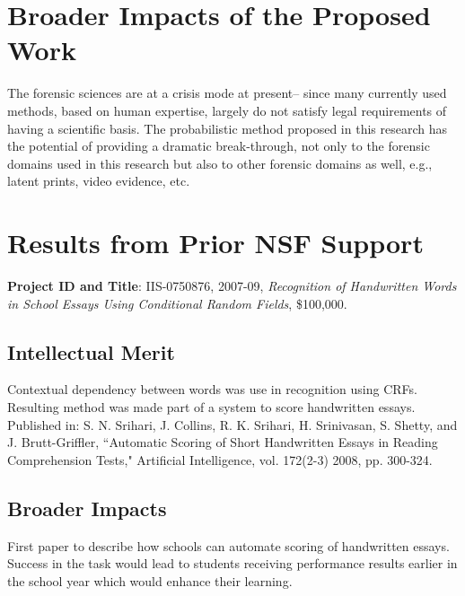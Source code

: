 \documentclass[11pt, doublespacing]{article}
\begin{document}
\section{Broader Impacts of the Proposed Work}
The forensic sciences are at a crisis mode at present-- since many currently used methods, based on human expertise, largely do not satisfy legal requirements of having a scientific basis. The probabilistic method proposed in this research has the potential of providing a dramatic break-through, not only to the forensic domains used in this research but also to other forensic domains as well, e.g., latent prints, video evidence, etc.
\section{Results from Prior NSF Support}
 {\bf Project ID and Title}: IIS-0750876, 2007-09,  {\em Recognition of Handwritten Words in School Essays Using Conditional Random Fields}, \$100,000.  
\subsection{Intellectual Merit} 
Contextual dependency between words was use in recognition using CRFs. Resulting method was made part of a system to score handwritten essays.
Published  in:
S. N. Srihari, J. Collins, R. K. Srihari, H. Srinivasan, S. Shetty, and J. Brutt-Griffler, ``Automatic Scoring of Short Handwritten Essays in Reading Comprehension Tests," Artificial Intelligence, vol. 172(2-3) 2008, pp. 300-324.
\subsection{Broader Impacts}
First paper to describe how schools can automate scoring of handwritten essays. Success in the task would lead to  students receiving performance results earlier in the school year which would enhance their learning.

\newpage
{}


\end{document}
